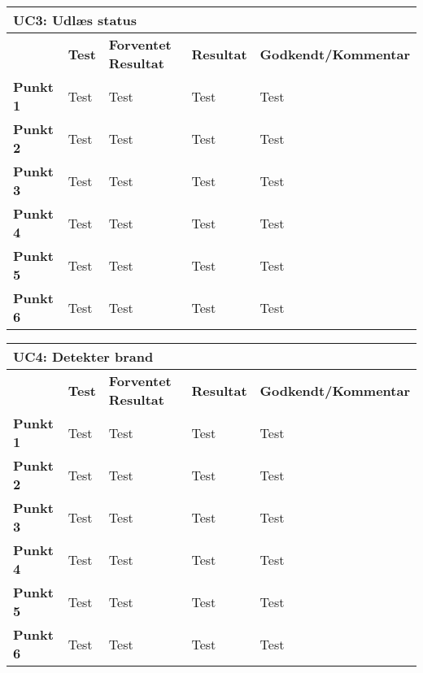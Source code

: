 \begin{table}[htbp] \centering
\begin{tabular}{|l|l|l|l|l|} %
	\hline
\multicolumn{5}{|l|}{\textbf{UC3: Udlæs status}} \\\hline
	&\textbf{Test} &\textbf{Forventet Resultat} &\textbf{Resultat} &\textbf{Godkendt/Kommentar} \\\hline
\textbf{Punkt 1}		&Test	&Test 	&Test	&Test \\\hline
\textbf{Punkt 2}		&Test	&Test 	&Test	&Test \\\hline
\textbf{Punkt 3}		&Test	&Test 	&Test	&Test \\\hline
\textbf{Punkt 4}		&Test	&Test 	&Test	&Test \\\hline
\textbf{Punkt 5}		&Test	&Test 	&Test	&Test \\\hline
\textbf{Punkt 6}		&Test	&Test 	&Test	&Test \\\hline
	\end{tabular}
	\label{ATUC3} 
\end{table}

\begin{table}[htbp] \centering
\begin{tabular}{|l|l|l|l|l|} %
	\hline
\multicolumn{5}{|l|}{\textbf{UC4: Detekter brand}} \\\hline
	&\textbf{Test} &\textbf{Forventet Resultat} &\textbf{Resultat} &\textbf{Godkendt/Kommentar} \\\hline
\textbf{Punkt 1}		&Test	&Test 	&Test	&Test \\\hline
\textbf{Punkt 2}		&Test	&Test 	&Test	&Test \\\hline
\textbf{Punkt 3}		&Test	&Test 	&Test	&Test \\\hline
\textbf{Punkt 4}		&Test	&Test 	&Test	&Test \\\hline
\textbf{Punkt 5}		&Test	&Test 	&Test	&Test \\\hline
\textbf{Punkt 6}		&Test	&Test 	&Test	&Test \\\hline
	\end{tabular}
	\label{ATUC4} 
\end{table}

